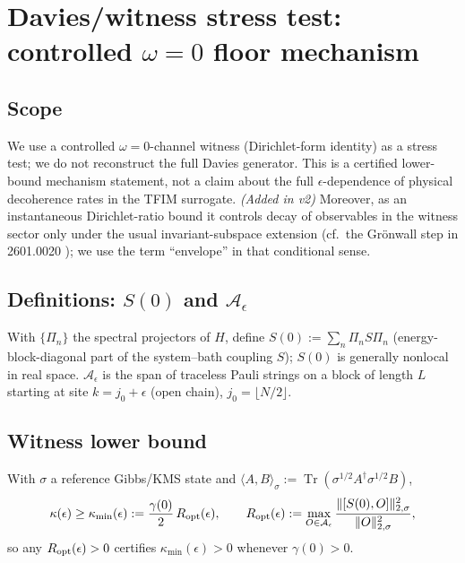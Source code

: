 \documentclass[11pt]{article}
\newcommand{\Tr}{\operatorname{Tr}}
\begin{document}
\section{Davies/witness stress test: controlled $\omega = 0$ floor
mechanism}
\label{sec:witness}
\subsection{Scope}
We use a controlled $\omega = 0$-channel witness (Dirichlet-form
identity) as a stress test; we do not reconstruct the full Davies
generator. This is a certified lower-bound mechanism statement, not a
claim about the full $\epsilon$-dependence of physical decoherence rates
in the TFIM surrogate. \emph{(Added in v2)} Moreover, as an instantaneous
Dirichlet-ratio bound it controls decay of observables in the witness
sector only under the usual invariant-subspace extension (cf.\ the
Gr\"onwall step in 2601.0020 \cite{S0020}); we use the term
``envelope'' in that conditional sense.

\subsection{Definitions: $S(0)$ and $\mathcal{A}_\epsilon$}
With $\{\Pi_n\}$ the spectral projectors of $H$, define $S(0) := \sum_n
\Pi_n S \Pi_n$ (energy-block-diagonal part of the system--bath coupling
$S$); $S(0)$ is generally nonlocal in real space. $\mathcal{A}_\epsilon$
is the span of traceless Pauli strings on a block of length $L$ starting
at site $k = j_0 + \epsilon$ (open chain), $j_0 = \lfloor N/2 \rfloor$.

\subsection{Witness lower bound}
With $\sigma$ a reference Gibbs/KMS state and $\langle A, B
\rangle_\sigma := \Tr(\sigma^{1/2} A^\dagger \sigma^{1/2} B)$,
\[
\kappa(\epsilon) \ge \kappa_{\min}(\epsilon) := \frac{\gamma(0)}{2}\,
R_{\rm opt}(\epsilon),
\qquad
R_{\rm opt}(\epsilon) := \max_{O \in \mathcal{A}_\epsilon}
\frac{\|[S(0), O]\|^2_{2,\sigma}}{\|O\|^2_{2,\sigma}} ,
\]
so any $R_{\rm opt}(\epsilon) > 0$ certifies $\kappa_{\min}(\epsilon) > 0$
whenever $\gamma(0) > 0$.
\end{document}
